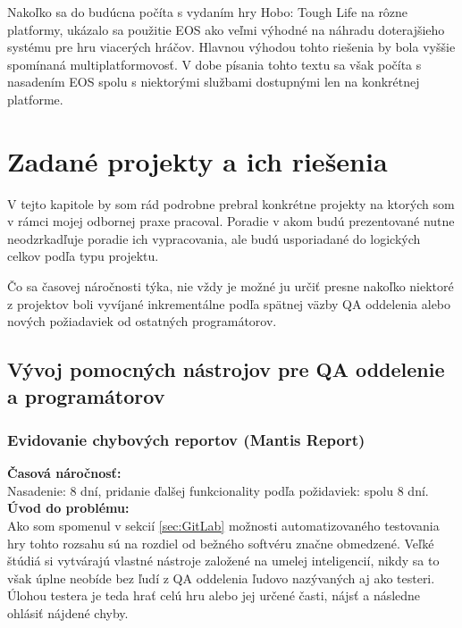 \documentclass[slovak, bachelorpractice]{diploma}
\begin{document}
Nakoľko sa do budúcna počíta s vydaním hry Hobo: Tough Life na rôzne platformy, ukázalo sa použitie EOS ako veľmi výhodné na náhradu doterajšieho systému pre hru viacerých hráčov. Hlavnou výhodou tohto riešenia by bola vyššie spomínaná multiplatformovosť. V dobe písania tohto textu sa však počíta s nasadením EOS spolu s niektorými službami dostupnými len na konkrétnej platforme.

\chapter{Zadané projekty a ich riešenia}
\label{sec:Projects}
V tejto kapitole by som rád podrobne prebral konkrétne projekty na ktorých som v rámci mojej odbornej praxe pracoval. Poradie v akom budú prezentované nutne neodzrkadľuje poradie ich vypracovania, ale budú usporiadané do logických celkov podľa typu projektu. 

Čo sa časovej náročnosti týka, nie vždy je možné ju určiť presne nakoľko niektoré z projektov boli vyvíjané inkrementálne podľa spätnej väzby QA oddelenia alebo nových požiadaviek od ostatných programátorov.

\section{Vývoj pomocných nástrojov pre QA oddelenie a programátorov}
\label{sec:QACode}
\subsection{Evidovanie chybových reportov (Mantis Report)}
\label{sec:Report}
\textbf{Časová náročnosť:} \\ Nasadenie: 8 dní, pridanie ďalšej funkcionality podľa požidaviek: spolu 8 dní.\\
\textbf{Úvod do problému:} \\ Ako som spomenul v sekcií \ref{sec:GitLab} možnosti automatizovaného testovania hry tohto rozsahu sú na rozdiel od bežného softvéru značne obmedzené. Veľké štúdiá si vytvárajú vlastné nástroje založené na umelej inteligencií, nikdy sa to však úplne neobíde bez ľudí z QA oddelenia ľudovo nazývaných aj ako testeri. Úlohou testera je teda hrať celú hru alebo jej určené časti, nájsť a následne ohlásiť nájdené chyby. 
\end{document}
